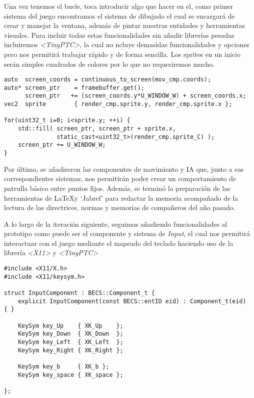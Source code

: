 Una vez tenemos el bucle, toca introducir algo que hacer en el, como primer sistema del juego
encontramos el sistema de dibujado el cual se encargará de crear y manejar la ventana, además
de pintar nuestras entidades y herramientas visuales. Para incluir todas estas funcionalidades
sin añadir librerías pesadas incluiremos \textit{\textless TinyPTC\textgreater}, la cual no 
ncluye demasidas funcionalidades y opciones pero nos permitirá trabajar rápido y de forma 
sencilla. Los sprites en un inicio serán simples cuadrados de colores por lo que no requeriremos 
mucho.

\begin{lstlisting}[style=CodigoC++, caption={Dibujado entidades},label=draw_ent]
auto  screen_coords = continuous_to_screen(mov_cmp.coords);
auto* screen_ptr    = framebuffer.get();
      screen_ptr   += (screen_coords.y*U_WINDOW_W) + screen_coords.x;
vec2  sprite        { render_cmp.sprite.y, render_cmp.sprite.x };

for(uint32_t i=0; i<sprite.y; ++i) {
    std::fill( screen_ptr, screen_ptr + sprite.x,
    		   static_cast<uint32_t>(render_cmp.sprite_C) );
	screen_ptr += U_WINDOW_W;
}
\end{lstlisting}

Por último, se añadireron las componentes de movimiento y \ac{IA} que, junto a sus correspondientes
sistemas, nos permitirán poder crear un comportamiento de patrulla básico entre puntos fijos.
Además, se terminó la preparación de las herramientas de \LaTeX y `Jabref' para redactar la 
memoria acompañado de la lectura de las directrices, normas y memorias de compañeros del año 
pasado.

A lo largo de la iteración siguiente, seguimos añadiendo funcionalidades al prototipo como puede 
ser el componente y sistema de \textit{Input}, el cual nos permitirá interactuar con el juego
mediante el mapeado del teclado haciendo uso de la librería \textit{\textless X11\textgreater}
y \textit{\textless TinyPTC\textgreater}

\newpage

\begin{lstlisting}[style=CodigoC++, caption={Componente de input},label=input_cmp]
#include <X11/X.h>
#include <X11/keysym.h>

struct InputComponent : BECS::Component_t {
    explicit InputComponent(const BECS::entID eid) : Component_t(eid) { }

    KeySym key_Up    { XK_Up    };
    KeySym key_Down  { XK_Down  };
    KeySym key_Left  { XK_Left  };
    KeySym key_Right { XK_Right };

    KeySym key_b     { XK_b };
    KeySym key_space { XK_space };

};
\end{lstlisting}


